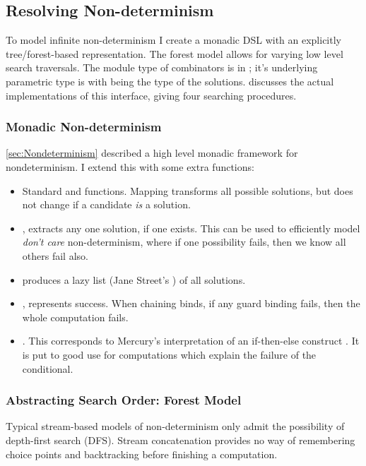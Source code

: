 \subsection{Resolving Non-determinism}
\label{sec:ResolvingNondeterminism}
To model infinite non-determinism I create a monadic DSL with an explicitly tree/forest-based representation. The forest model allows for varying low level search traversals. The module type of combinators is in ; it's underlying parametric type is  with  being the type of the solutions.  discusses the actual implementations of this interface, giving four searching procedures.

\subsubsection{Monadic Non-determinism}
\cref{sec:Nondeterminism} described a high level monadic framework for nondeterminism. I extend this with some extra functions:

\begin{itemize}
\item Standard  and  functions. Mapping transforms all possible solutions, but does not change if a candidate \textit{is} a solution.
\item {}, extracts any one solution, if one exists. This can be used to efficiently model \textit{don't care} non-determinism, where if one possibility fails, then we know all others fail also.
\item {} produces a lazy list (Jane Street's ) of all solutions.
\item {}, represents success. When chaining binds, if any guard binding fails, then the whole computation fails.
\item {}. This corresponds to Mercury's interpretation of an if-then-else construct \cite{Mercury}. It is put to good use for computations which explain the failure of the conditional.
\end{itemize}

\subsubsection{Abstracting Search Order: Forest Model}
Typical stream-based models of non-determinism \cite{ListOfSuccess} only admit the possibility of depth-first search (DFS). Stream concatenation provides no way of remembering choice points and backtracking before finishing a computation. 

